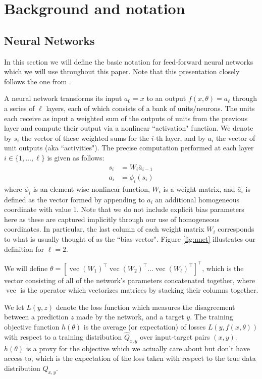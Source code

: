 \documentclass[12pt]{article}
\newcommand{\nonlin}{\phi}
\newcommand{\ovec}{\operatorname{vec}}
\begin{document}
\section{Background and notation}
\label{sec:background_and_notation}

\subsection{Neural Networks}
\label{sec:neural_networks}

In this section we will define the basic notation for feed-forward neural networks which we will use throughout this paper.  Note that this presentation closely follows the one from \citet{ng_martens}.

A neural network transforms its input $a_0 = x$ to an output $f(x,\theta) = a_\ell$ through a series of $\ell$ layers, each of which consists of a bank of units/neurons.  The units each receive as input a weighted sum of the outputs of units from the previous layer and compute their output via a nonlinear ``activation" function.   We denote by $s_i$ the vector of these weighted sums for the $i$-th layer, and by $a_i$ the vector of unit outputs (aka ``activities"). The precise computation performed at each layer $i \in \{1,\ldots,\ell\}$ is given as follows:
\begin{align*}
s_i &= W_i \bar{a}_{i-1} \\
a_i &= \nonlin_i(s_i)
\end{align*}
where $\nonlin_i$ is an element-wise nonlinear function, %
$W_i$ is a weight matrix, and $\bar{a}_i$ is defined as the vector formed by appending to $a_i$ an additional homogeneous coordinate with value 1.  Note that we do not include explicit bias parameters here as these are captured implicitly through our use of homogeneous coordinates.  In particular, the last column of each weight matrix $W_i$ corresponds to what is usually thought of as the ``bias vector".  Figure \ref{fig:nnet} illustrates our definition for $\ell = 2$.

We will define $\theta = [ \ovec(W_1)^\top \ovec(W_2)^\top \dots \ovec(W_\ell)^\top ]^\top$, which is the vector consisting of all of the network's parameters concatenated together, where $\ovec$ is the operator which vectorizes matrices by stacking their columns together.

We let $L(y,z)$ denote the loss function which measures the disagreement between a prediction $z$ made by the network, and a target $y$.  The training objective function $h(\theta)$ is the average (or expectation) of losses $L(y,f(x,\theta))$ with respect to a training distribution $\hat{Q}_{x,y}$ over input-target pairs $(x, y)$.  $h(\theta)$ is a proxy for the objective which we actually care about but don't have access to, which is the expectation of the loss taken with respect to the true data distribution $Q_{x,y}$.
\end{document}
